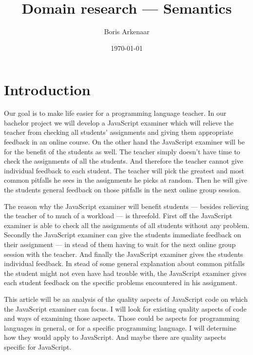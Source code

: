 \documentclass{article}
\begin{document}
 

\title{Domain research --- Semantics}
\author{Boris Arkenaar}
\date{\today}
\maketitle 


\section{Introduction} 

Our goal is to make life easier for a programming language teacher. In our
bachelor project we will develop a JavaScript examiner which will relieve the
teacher from checking all students' assignments and giving them appropriate
feedback in an online course. On the other hand the JavaScript examiner will be
for the benefit of the students as well. The teacher simply doesn't have time
to check the assignments of all the students. And therefore the teacher cannot
give individual feedback to each student. The teacher will pick the greatest
and most common pitfalls he sees in the assignments he picks at random. Then he
will give the students general feedback on those pitfalls in the next online
group session.

The reason why the JavaScript examiner will benefit students --- besides
relieving the teacher of to much of a workload --- is threefold. First off the
JavaScript examiner is able to check all the assignments of all students
without any problem. Secondly the JavaScript examiner can give the students
immediate feedback on their assignment --- in stead of them having to wait for
the next online group session with the teacher. And finally the JavaScript
examiner gives the students individual feedback. In stead of some general
explanation about common pitfalls the student might not even have had trouble
with, the JavaScript examiner gives each student feedback on the specific
problems encountered in his assignment.

This article will be an analysis of the quality aspects of JavaScript code on
which the JavaScript examiner can focus. I will look for existing quality
aspects of code and ways of examining those aspects. Those could be aspects for
programming languages in general, or for a specific programming language. I
will determine how they would apply to JavaScript. And maybe there are quality
aspects specific for JavaScript.
\end{document}
